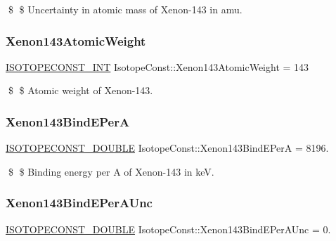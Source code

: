 \$ \$ Uncertainty in atomic mass of Xenon-\/143 in amu. \mbox{\label{group___isotope_const-_xenon-_xe143_ga3d070e390a16d69375558df81c9f8acb}} 
\subsubsection{\texorpdfstring{Xenon143\+Atomic\+Weight}{Xenon143AtomicWeight}}
{\footnotesize\ttfamily \mbox{\hyperlink{group___isotope_const-_macros_ga5f18360b3e99483a35c32d789e62621c}{I\+S\+O\+T\+O\+P\+E\+C\+O\+N\+S\+T\+\_\+\+I\+NT}} Isotope\+Const\+::\+Xenon143\+Atomic\+Weight = 143}

\$ \$ Atomic weight of Xenon-\/143. \mbox{\label{group___isotope_const-_xenon-_xe143_ga9e21c8736ce95a69e048f9ec97c69e62}} 
\subsubsection{\texorpdfstring{Xenon143\+Bind\+E\+PerA}{Xenon143BindEPerA}}
{\footnotesize\ttfamily \mbox{\hyperlink{group___isotope_const-_macros_ga8f45a7272ce02c0b4c65c44636ed719a}{I\+S\+O\+T\+O\+P\+E\+C\+O\+N\+S\+T\+\_\+\+D\+O\+U\+B\+LE}} Isotope\+Const\+::\+Xenon143\+Bind\+E\+PerA = 8196.}

\$ \$ Binding energy per A of Xenon-\/143 in keV. \mbox{\label{group___isotope_const-_xenon-_xe143_gaa3d591b5750cb1431c42a4f632561448}} 
\subsubsection{\texorpdfstring{Xenon143\+Bind\+E\+Per\+A\+Unc}{Xenon143BindEPerAUnc}}
{\footnotesize\ttfamily \mbox{\hyperlink{group___isotope_const-_macros_ga8f45a7272ce02c0b4c65c44636ed719a}{I\+S\+O\+T\+O\+P\+E\+C\+O\+N\+S\+T\+\_\+\+D\+O\+U\+B\+LE}} Isotope\+Const\+::\+Xenon143\+Bind\+E\+Per\+A\+Unc = 0.}

